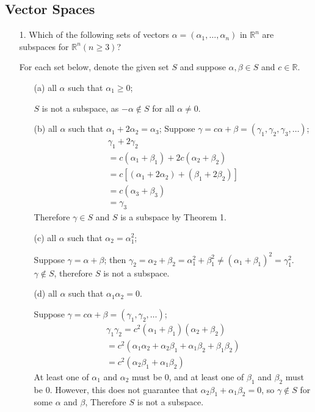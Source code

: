 \documentclass{article}
\begin{document}
\subsection{Vector Spaces}
\begin{enumerate}[listparindent=\parindent]
\item[1.] Which of the following sets of vectors \(\alpha = (\alpha_1, \dots, \alpha_n)\)
    in \(\mathbb{R}^n\) are subspaces for \(\mathbb{R}^n (n \geq 3)\)?

    For each set below, denote the given set \(S\) and suppose \(\alpha, \beta \in S\) and \(c \in \mathbb{R}\).
    \begin{enumerate}[listparindent=\parindent]
        \item[(a)] all \(\alpha\) such that \(\alpha_1 \geq 0\);

            \(S\) is not a subspace, as \(-\alpha \notin S\) for all \(\alpha \neq 0\).

        \item[(b)] all \(\alpha\) such that \(\alpha_1 + 2\alpha_2 = \alpha_3\);
            Suppose \(\gamma = c\alpha + \beta = (\gamma_1, \gamma_2, \gamma_3, \dots)\);
            \begin{gather*}
                \gamma_1 + 2\gamma_2 \\
                = c(\alpha_1 + \beta_1) + 2c(\alpha_2 + \beta_2) \\
                = c[(\alpha_1 + 2\alpha_2) + (\beta_1 + 2\beta_2)] \\
                = c(\alpha_3 + \beta_3) \\
                = \gamma_3
            \end{gather*}
            Therefore \(\gamma \in S\) and \(S\) is a subspace by Theorem 1.

        \item[(c)] all \(\alpha\) such that \(\alpha_2 = \alpha_1^2\);

            Suppose \(\gamma = \alpha + \beta\);
            then \(\gamma_2 = \alpha_2 + \beta_2 = \alpha_1^2 + \beta_1^2 \neq (\alpha_1 + \beta_1)^2 = \gamma_1^2\).
            \(\gamma \notin S\), therefore \(S\) is not a subspace.

        \item[(d)] all \(\alpha\) such that \(\alpha_1\alpha_2 = 0\).

            Suppose \(\gamma = c\alpha + \beta = (\gamma_1, \gamma_2, \dots)\);
            \begin{gather*}
                \gamma_1\gamma_2 = c^2(\alpha_1 + \beta_1)(\alpha_2 + \beta_2) \\
                = c^2(\alpha_1\alpha_2 + \alpha_2\beta_1 + \alpha_1\beta_2 + \beta_1\beta_2) \\
                = c^2(\alpha_2\beta_1 + \alpha_1\beta_2)
            \end{gather*}
            At least one of \(\alpha_1\) and \(\alpha_2\) must be 0, and at least one of \(\beta_1\) and \(\beta_2\) must be 0.
            However, this does not guarantee that \(\alpha_2\beta_1 + \alpha_1\beta_2 = 0\), so \(\gamma \notin S\) for some \(\alpha\) and \(\beta\),
            Therefore \(S\) is not a subspace.


\end{enumerate}
\end{enumerate}
\end{document}
